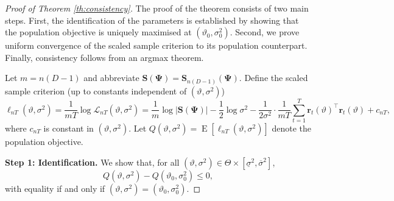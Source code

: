 \documentclass[12pt]{article}
\theoremstyle{plain}
\theoremstyle{definition}
\newcommand{\xvec}{\boldsymbol}
\newcommand{\xmat}{\mathbf}
\DeclareMathOperator{\E}{E}
\begin{document}
\begin{proof}[Proof of Theorem \ref{th:consistency}]

The proof of the theorem consists of two main steps. First, the identification of the parameters is established by showing that the population objective is uniquely maximised at $(\vartheta_0,\sigma_0^2)$. Second, we prove uniform convergence of the
scaled sample criterion to its population counterpart. Finally, consistency follows from an argmax theorem.

\medskip
Let $m = n(D-1)$ and abbreviate $\xmat{S}(\xmat{\Psi})=\xmat{S}_{n(D-1)}(\xmat{\Psi})$. Define the scaled sample criterion (up to constants independent of $(\vartheta,\sigma^2)$)
\begin{equation}\label{eq:ellnT_pf}
\ell_{nT}(\vartheta,\sigma^2)
=
\frac{1}{mT}\log\mathcal{L}_{nT}(\vartheta,\sigma^2)
=
\frac{1}{m}\log|\xmat{S}(\xmat{\Psi})|
-\frac{1}{2}\log\sigma^2
-\frac{1}{2\sigma^2}\cdot\frac{1}{mT}\sum_{t=1}^T \xvec{r}_t(\vartheta)^\top \xvec{r}_t(\vartheta)
+c_{nT},
\end{equation}
where $c_{nT}$ is constant in $(\vartheta,\sigma^2)$. Let $Q(\vartheta,\sigma^2)=\E[\ell_{nT}(\vartheta,\sigma^2)]$ denote the population objective.

\medskip
\noindent\textbf{Step 1: Identification.}
We show that, for all $(\vartheta,\sigma^2)\in\Theta\times[\underline\sigma^2,\overline\sigma^2]$,
\begin{equation}\label{eq:ident_pf}
Q(\vartheta,\sigma^2)-Q(\vartheta_0,\sigma_0^2)\le 0,
\end{equation}
with equality if and only if $(\vartheta,\sigma^2)=(\vartheta_0,\sigma_0^2)$.


\end{proof}
\end{document}
